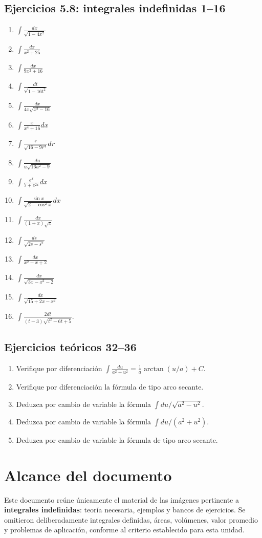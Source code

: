 \documentclass[11pt]{article}
\begin{document}
\subsection*{Ejercicios 5.8: integrales indefinidas 1--16}
\begin{enumerate}[itemsep=4pt]
\item $\int\frac{dx}{\sqrt{1-4x^2}}$ \item $\int\frac{dx}{x^2+25}$ \item $\int\frac{dx}{9x^2+16}$ \item $\int\frac{dt}{\sqrt{1-16t^2}}$
\item $\int\frac{dx}{4x\sqrt{x^2-16}}$ \item $\int\frac{x}{x^4+16}dx$ \item $\int\frac{r}{\sqrt{16-9r^4}}dr$ \item $\int\frac{du}{u\sqrt{16u^2-9}}$
\item $\int\frac{e^x}{7+e^{2x}}dx$ \item $\int\frac{\sin x}{\sqrt{2-\cos^2x}}dx$ \item $\int\frac{dx}{(1+x)\sqrt x}$ \item $\int\frac{ds}{\sqrt{2s-s^2}}$
\item $\int\frac{dx}{x^2-x+2}$ \item $\int\frac{dx}{\sqrt{3x-x^2-2}}$ \item $\int\frac{dx}{\sqrt{15+2x-x^2}}$ \item $\int\frac{2dt}{(t-3)\sqrt{t^2-6t+5}}$.
\end{enumerate}
\subsection*{Ejercicios teóricos 32--36}
\begin{enumerate}[start=32]
\item Verifique por diferenciación $\int\frac{du}{a^2+u^2}=\frac1a\arctan(u/a)+C$.
\item Verifique por diferenciación la fórmula de tipo arco secante.
\item Deduzca por cambio de variable la fórmula $\int du/\sqrt{a^2-u^2}$.
\item Deduzca por cambio de variable la fórmula $\int du/(a^2+u^2)$.
\item Deduzca por cambio de variable la fórmula de tipo arco secante.
\end{enumerate}

\section*{Alcance del documento}
Este documento reúne únicamente el material de las imágenes pertinente a \textbf{integrales indefinidas}: teoría necesaria, ejemplos y bancos de ejercicios. Se omitieron deliberadamente integrales definidas, áreas, volúmenes, valor promedio y problemas de aplicación, conforme al criterio establecido para esta unidad.
\end{document}
